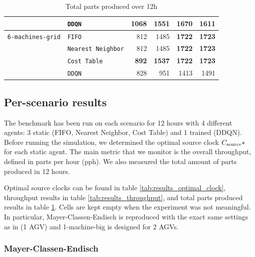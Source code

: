 \documentclass[sn-mathphys]{sn-jnl}
\begin{document}
\begin{table}[ht]
\begin{tabular}{|l|l||r|r|r|r|}
 & \texttt{DDQN} & 1068  \quad & 1551  \quad & 1670  \quad & 1611  \quad  \\ 
\hline \texttt{6-machines-grid} & \texttt{FIFO}& 812  \quad & 1485  \quad & \textbf{1722} \quad & \textbf{1723} \quad  \\ 
 & \texttt{Nearest Neighbor} & 812  \quad & 1485  \quad & \textbf{1722} \quad & \textbf{1723} \quad  \\ 
 & \texttt{Cost Table} & \textbf{892} \quad & \textbf{1537} \quad & \textbf{1722} \quad & \textbf{1723} \quad  \\ 
 & \texttt{DDQN} & 828  \quad & 951  \quad & 1413  \quad & 1491  \quad  \\ 
\hline
\end{tabular}

\egroup
\caption{Total parts produced over 12h}
\label{tab:results_total_parts}
\end{table}

\subsection{Per-scenario results}

The benchmark has been run on each scenario for 12 hours with 4 different agents: 3 static (FIFO, Nearest Neighbor, Cost Table) and 1 trained (DDQN). Before running the simulation, we determined the optimal source clock $C_{\rm source}*$ for each static agent. The main metric that we monitor is the overall throughput, defined in parts per hour (pph). We also measured the total amount of parts produced in 12 hours.

Optimal source clocks can be found in table \ref{tab:results_optimal_clock}, throughput results in table \ref{tab:results_throughput}, and total parts produced results in table \ref{tab:results_total_parts}. Cells are kept empty when the experiment was not meaningful. In particular, Mayer-Classen-Endisch is reproduced with the exact same settings as in \cite{Mayer2021} (1 AGV) and 1-machine-big is designed for 2 AGVs.

\subsubsection{Mayer-Classen-Endisch}
\end{document}
